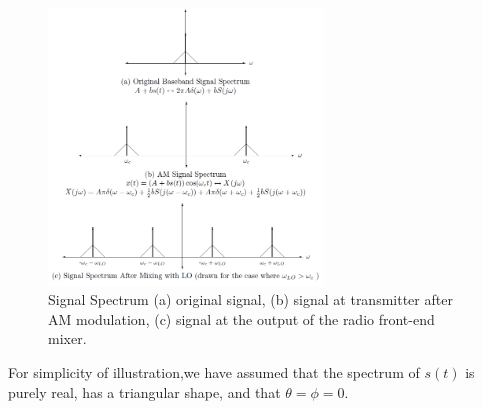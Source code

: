 \documentclass[utf8]{article}
\begin{document}
{	\begin{figure}[H]
		\begin{small}
			\begin{center}
				\includegraphics[width=0.65\textwidth]{figures/Figure7.png}
			\end{center}
			\caption{Signal Spectrum (a) original signal, (b) signal at transmitter after AM modulation, (c) signal at the output of the radio front-end mixer.}
			\label{fig:spectrum}
		\end{small}
	\end{figure}
	
	For simplicity of illustration,we have assumed that the spectrum of $s(t)$ is purely real, has a triangular shape, and that $\theta = \phi = 0$.
}
\end{document}
